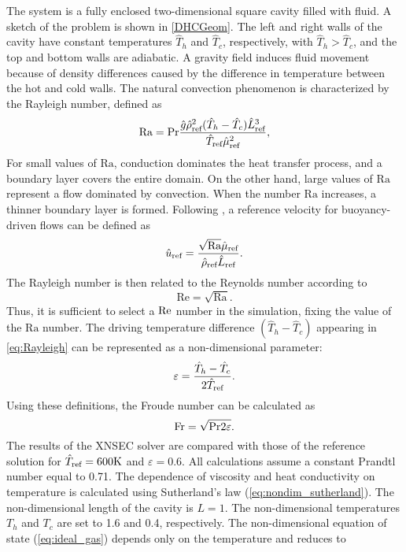 The system is a fully enclosed two-dimensional square cavity filled with fluid.  A sketch of the problem is shown in \cref{DHCGeom}. The left and right walls of the cavity have constant temperatures $\hat{T}_h$ and $\hat{T}_c$, respectively, with $\hat{T}_h >\hat{T}_c$, and the top and bottom walls are adiabatic. A gravity field induces fluid movement because of density differences caused by the difference in temperature between the hot and cold walls.
The natural convection phenomenon is characterized by the Rayleigh number, defined as
\begin{equation}\label{eq:Rayleigh}
	\text{Ra} = \Prandtl \frac{\hat g \RefVal{\rho}^2(\hat T_h-\hat T_c) \RefVal{L}^3}{\RefVal{T}\RefVal{\mu}^2},
\end{equation}
For small values of $\text{Ra}$, conduction dominates the heat transfer process, and a boundary layer covers the entire domain. On the other hand, large values of $\text{Ra}$ represent a flow dominated by convection. When the number $\text{Ra}$ increases, a thinner boundary layer is formed.
Following \textcite{vierendeelsBenchmarkSolutionsNatural2003}, a reference velocity for buoyancy-driven flows can be defined as
\begin{equation}
	\RefVal{u} = \frac{\sqrt{\text{Ra}} \RefVal{\mu}}{\RefVal{\rho}\RefVal{L}}.
\end{equation}
The Rayleigh number is then related to the Reynolds number according to
\begin{equation}
	\text{Re} = \sqrt{\text{Ra}}.
\end{equation}
Thus, it is sufficient to select a $\Reynolds$ number in the simulation, fixing the value of the $\text{Ra}$ number. The driving temperature difference $(\hat T_h - \hat T_c)$ appearing in \cref{eq:Rayleigh} can be represented as a non-dimensional parameter:
\begin{equation}\label{eq:nondimensionalTemperature}
	\varepsilon = \frac{\hat T_h - \hat T_c}{2\RefVal{T}}.
\end{equation}
Using these definitions, the Froude number can be calculated as
\begin{equation}
	\Froude = \sqrt{\Prandtl 2 \varepsilon}.
\end{equation}
The results of the XNSEC solver are compared with those of the reference solution for $\RefVal{T} = 600\si{K}$  and $\varepsilon = 0.6$. All calculations assume a constant Prandtl number equal to 0.71. The dependence of viscosity and heat conductivity on temperature is calculated using Sutherland's law (\cref{eq:nondim_sutherland}). The non-dimensional length of the cavity is $L=1$. The non-dimensional temperatures $T_h$ and $T_c$ are set to 1.6 and 0.4, respectively. The non-dimensional equation of state (\cref{eq:ideal_gas}) depends only on the temperature and reduces to
